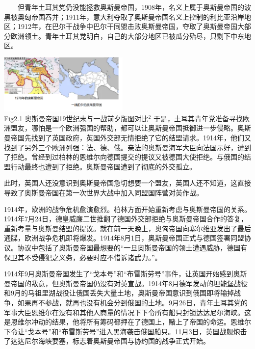 \documentclass{article}
\begin{document}
\begin{flushleft}
    \justifying
    \ \ \ \ 但青年土耳其党仍没能拯救奥斯曼帝国，1908年，名义上属于奥斯曼帝国的波黑被奥匈帝国吞并；1911年，意大利夺取了奥斯曼帝国名义上控制的利比亚沿岸地区；1912年，在巴尔干战争中巴尔干同盟击败奥斯曼帝国，夺取了奥斯曼帝国大部分欧洲领土。青年土耳其党明白，自己的大部分地区已被瓜分殆尽，只剩下中东地区。
\end{flushleft}
\centering\includegraphics[width=6.4cm]{em.png}\\
\centering {} Fig2.1 奥斯曼帝国19世纪末与一战前夕版图对比$^2$\clearpage
\justifying
于是，土耳其青年党准备寻找欧洲盟友，哪怕是一个欧洲强国的帮助，都可以让奥斯曼帝国抵御进一步侵略。奥斯曼帝国先找到了英国政府，英国外交部无情拒绝了它的结盟请求。1914年，他们又找到了另外三个欧洲列强：法、德、俄。亲法的奥斯曼海军大臣向法国示好，遭到了拒绝。曾经到过柏林的恩维尔向德国提交的提议又被德国大使拒绝。与俄国的结盟行动最终也遭到了拒绝。奥斯曼帝国遭到了彻底的外交孤立。

此时，英国人还没意识到奥斯曼帝国急切想要一个盟友，英国人还不知道，这直接导致了奥斯曼帝国在第一次世界大战中加入同盟国阵营对英作战。

1914年，欧洲的战争危机愈演愈烈。柏林方面开始重新考虑与奥斯曼帝国的关系。1914年7月24日，德皇威廉二世推翻了德国外交部拒绝与奥斯曼帝国合作的答复，重新考量与奥斯曼结盟的提议。就在前一天晚上，奥匈帝国向塞尔维亚发出了最后通牒，欧洲战争危机即将爆发。1914年8月1日，奥斯曼帝国正式与德国签署同盟协议。协议中包括了奥斯曼帝国最想要的“一旦奥斯曼帝国的领土遭遇威胁，德国有保卫其不受侵犯之义务，必要时应不惜诉诸武力。”。

1914年9月奥斯曼帝国发生了“戈本号”和“布雷斯劳号”事件，让英国开始感到奥斯曼帝国的敌意，但奥斯曼帝国仍没有对英宣战。1914年8月德军发动的坦能堡战役和9月的马祖里湖战役让俄国丢失大量土地，奥斯曼帝国意识到俄国即将输掉战争，如果再不参战，就再也没有机会分到俄国的土地。9月26日，青年土耳其党的军事大臣恩维尔在没有和其他人商量的情况下下令所有船只封锁达达尼尔海峡。这是恩维尔冲动的结果，他将所有筹码都押在了德国上，赌上了帝国的命运。恩维尔下令让“戈本号”和“布雷斯劳号”进入黑海袭击俄国船只。11月3日，英国战舰炮击了达达尼尔海峡要塞，标志着奥斯曼帝国与协约国的战争正式开始。
\end{document}
